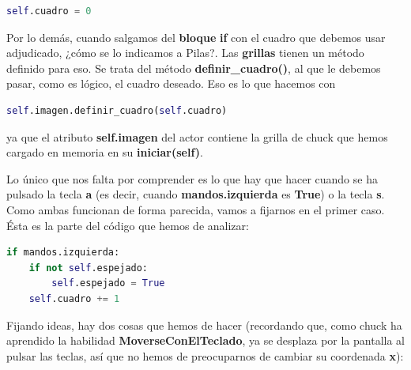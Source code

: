 \documentclass{article}
\begin{document}
\begin{lstlisting}[language=Python]
self.cuadro = 0
\end{lstlisting}
\vspace{\baselineskip}

Por lo demás, cuando salgamos del \textbf{bloque} \textcolor{codepurple}{\textbf{if}} con el cuadro que debemos usar adjudicado,  ¿cómo se lo indicamos a Pilas?. Las \textbf{grillas} tienen un método definido para eso. Se trata del método \textbf{definir\_cuadro()}, al que le debemos pasar, como es lógico, el cuadro deseado. Eso es lo que hacemos con\par

\begin{lstlisting}[language=Python]
self.imagen.definir_cuadro(self.cuadro)
\end{lstlisting}
\vspace{\baselineskip}

ya que el atributo \textbf{self.imagen} del actor contiene la grilla de chuck que hemos cargado en memoria en su \textbf{iniciar(self)}.\par
Lo único que nos falta por comprender es lo que hay que hacer cuando se ha pulsado la tecla \textbf{a} (es decir, cuando \textbf{mandos.izquierda} es \textcolor{codepurple}{\textbf{True}}) o la tecla \textbf{s}. Como ambas funcionan de forma parecida, vamos a fijarnos en el primer caso. Ésta es la parte del código que hemos de analizar:\par

\begin{lstlisting}[language=Python]
if mandos.izquierda:
    if not self.espejado:
        self.espejado = True
    self.cuadro += 1
\end{lstlisting}
\vspace{\baselineskip}

Fijando ideas, hay dos cosas que hemos de hacer (recordando que, como chuck ha 
aprendido la habilidad \textbf{MoverseConElTeclado}, ya se desplaza por la pantalla al pulsar las teclas, así que no hemos de preocuparnos de cambiar su coordenada \textbf{x}):\par
\end{document}
